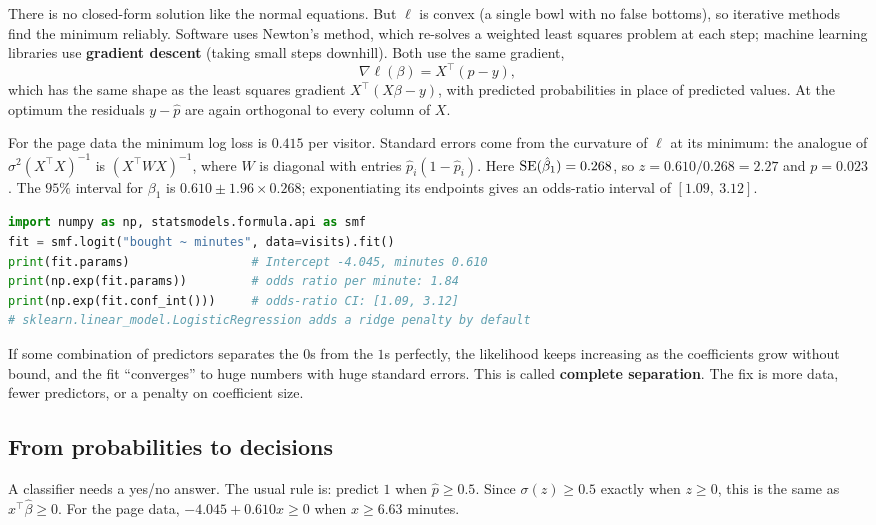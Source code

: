There is no closed-form solution like the normal equations. But $\ell$ is convex (a
single bowl with no false bottoms), so iterative methods find the minimum reliably.
Software uses Newton's method, which re-solves a weighted least squares problem at each
step; machine learning libraries use \textbf{gradient descent} (taking small steps downhill). Both use the same gradient,
\[
  \nabla\ell(\beta) = X^\top(p - y),
\]
which has the same shape as the least squares gradient $X^\top(X\beta - y)$, with
predicted probabilities in place of predicted values. At the optimum the residuals
$y - \hat p$ are again orthogonal to every column of $X$.

For the page data the minimum log loss is $0.415$ per visitor. Standard errors come from
the curvature of $\ell$ at its minimum: the analogue of $\sigma^2(X^\top X)^{-1}$ is
$(X^\top W X)^{-1}$, where $W$ is diagonal with entries $\hat p_i(1-\hat p_i)$. Here
$\operatorname{SE}(\hat\beta_1) = 0.268$, so $z = 0.610/0.268 = 2.27$ and $p = 0.023$. The $95\%$
interval for $\beta_1$ is $0.610 \pm 1.96\times 0.268$; exponentiating its endpoints gives
an odds-ratio interval of $[1.09,\ 3.12]$.

\begin{lstlisting}[language=Python]
import numpy as np, statsmodels.formula.api as smf
fit = smf.logit("bought ~ minutes", data=visits).fit()
print(fit.params)                 # Intercept -4.045, minutes 0.610
print(np.exp(fit.params))         # odds ratio per minute: 1.84
print(np.exp(fit.conf_int()))     # odds-ratio CI: [1.09, 3.12]
# sklearn.linear_model.LogisticRegression adds a ridge penalty by default
\end{lstlisting}

\begin{trapbox}
If some combination of predictors separates the $0$s from the $1$s perfectly, the
likelihood keeps increasing as the coefficients grow without bound, and the fit
``converges'' to huge numbers with huge standard errors. This is called
\textbf{complete separation}. The fix is more data, fewer predictors, or a penalty on
coefficient size.
\end{trapbox}

\subsection{From probabilities to decisions}

A classifier needs a yes/no answer. The usual rule is: predict $1$ when $\hat p \ge 0.5$.
Since $\sigma(z) \ge 0.5$ exactly when $z \ge 0$, this is the same as
$x^\top\hat\beta \ge 0$. For the page data, $-4.045 + 0.610x \ge 0$ when
$x \ge 6.63$ minutes.

